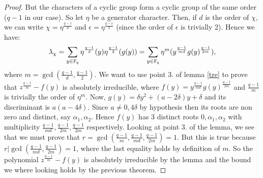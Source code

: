 \begin{cor}
\begin{proof}
But the characters of a cyclic group form a cyclic group of the same order ($q-1$ in our case). So let $\eta$ be a generator character.
Then, if $d$ is the order of $\chi$, we can write $\chi=\eta^{\frac{q-1}{d}}$ and $\epsilon=\eta^{\frac{q-1}{2}}$
(since the order of $\epsilon$ is trivially 2). Hence we have:
\begin{equation}
	\lambda_{\chi}=\sum_{y \in {\mathbb F}_q} \eta^{\frac{q-1}{d}}(y)\eta^{\frac{q-1}{2}}(g(y))=\sum_{y \in {\mathbb F}_q}
	\eta^m(y^{\frac{q-1}{md}}g(y)^{\frac{q-1}{2m}}),
\end{equation}
where $m=\gcd(\frac{q-1}{d},\frac{q-1}{2})$. We want to use point 3. of lemma \ref{tre} to prove that $z^{\frac{q-1}{m}}-f(y)$
is absolutely irreducible, where $f(y)=y^{\frac{q-1}{md}}g(y)^{\frac{q-1}{2m}}$ and $\frac{q-1}{m}$ is trivially the order
of $\eta^m$. Now, $g(y)=\delta y^2+(a-2\delta)y+\delta$
and its discriminant is $a(a-4\delta)$. Since $a\neq 0, 4\delta$ by hypothesis then its roots are non zero
and distinct, say $\alpha_1, \alpha_2$. Hence $f(y)$ has 3 distinct roots $0,\alpha_1,\alpha_2$ with multiplicity 
$\frac{q-1}{md}, \frac{q-1}{2m},\frac{q-1}{2m}$ respectively.
Looking at point 3. of the lemma, we see that we must prove that $r=\gcd(\frac{q-1}{m},\frac{q-1}{md},\frac{q-1}{2m})=1$.
But this is true because $r\vert \gcd(\frac{q-1}{md},\frac{q-1}{2m})=1$, where the last equality holds by definition of $m$.
So the polynomial $z^{\frac{q-1}{m}}-f(y)$ is absolutely irreducible by the lemma and the bound we where looking holds 
by the previous theorem.
\end{proof}
\end{cor}